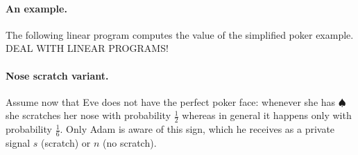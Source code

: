 \paragraph{An example.}

The following linear program computes the value
of the simplified poker example.
DEAL WITH LINEAR PROGRAMS!

\paragraph{Nose scratch variant.}
Assume now that Eve does not have the perfect poker face:
whenever she has $\spadesuit$ she scratches
her nose with probability $\frac{1}{2}$ whereas
in general it happens only with probability $\frac{1}{6}$.
Only Adam is aware of this sign,
which he receives
as a private signal $s$ (scratch) or $n$ (no scratch).

